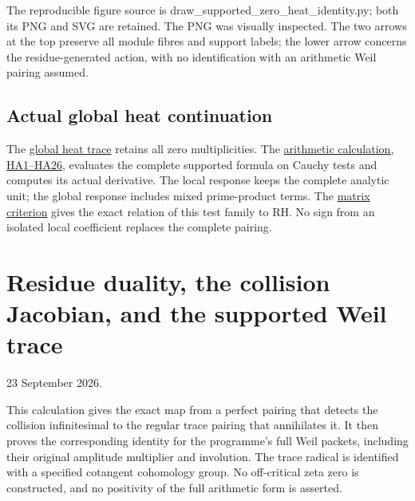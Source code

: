 \documentclass[
  10pt,
  a4paper,
]{article}
\begin{document}
The reproducible figure source is
draw\_supported\_zero\_heat\_identity.py; both its PNG and SVG are
retained. The PNG was visually inspected. The two arrows at the top
preserve all module fibres and support labels; the lower arrow concerns
the residue-generated action, with no identification with an arithmetic
Weil pairing assumed.

\subsection{Actual global heat
continuation}\label{actual-global-heat-continuation-1}

The \href{ACTUAL_HEAT_ZERO_DISTRIBUTION_VARIATION.md}{global heat trace}
retains all zero multiplicities. The
\href{HEAT_CAUCHY_ARITHMETIC_DERIVATION.md}{arithmetic calculation,
HA1--HA26}, evaluates the complete supported formula on Cauchy tests and
computes its actual derivative. The local response keeps the complete
analytic unit; the global response includes mixed prime-product terms.
The \href{CAUCHY_WEIL_POSITIVITY_CRITERION.md}{matrix criterion} gives
the exact relation of this test family to RH. No sign from an isolated
local coefficient replaces the complete pairing.

\clearpage

\section{Residue duality, the collision Jacobian, and the supported Weil
trace}\label{residue-duality-the-collision-jacobian-and-the-supported-weil-trace}

23 September 2026.

This calculation gives the exact map from a perfect pairing that detects
the collision infinitesimal to the regular trace pairing that
annihilates it. It then proves the corresponding identity for the
programme's full Weil packets, including their original amplitude
multiplier and involution. The trace radical is identified with a
specified cotangent cohomology group. No off-critical zeta zero is
constructed, and no positivity of the full arithmetic form is asserted.
\end{document}
